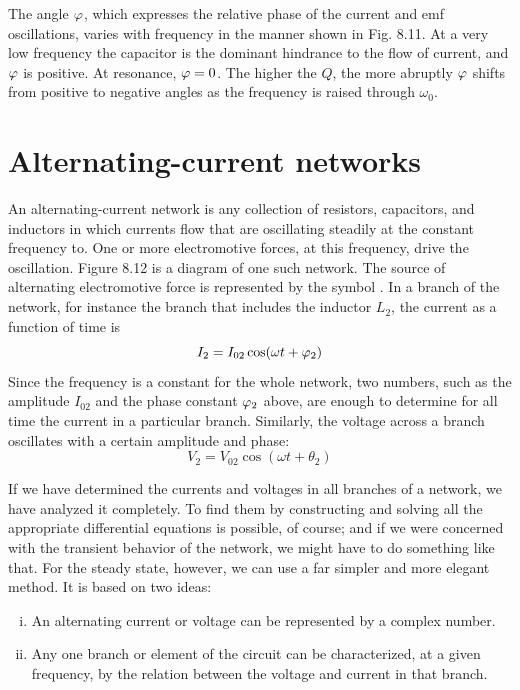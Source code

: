 The angle $\varphi$, which expresses the relative phase of the current and
emf oscillations, varies with frequency in the manner shown in
Fig. 8.11. At a very low frequency the capacitor is the dominant
hindrance to the flow of current, and $\varphi$ is positive. At resonance, $\varphi = 0$.
The higher the $Q$, the more abruptly $\varphi$ shifts from positive to negative
angles as the frequency is raised through $\omega_0$.

\section{Alternating-current networks}

An alternating-current network is any collection of resistors,
capacitors, and inductors in which currents flow that are oscillating
steadily at the constant frequency to. One or more electromotive
forces, at this frequency, drive the oscillation. Figure 8.12 is a diagram
of one such network. The source of alternating electromotive
force is represented by the symbol 
.
In a branch of the network,
for instance the branch that includes the inductor $L_2$, the current as
a function of time is
\begin{equation}
  I_2 = I_{02} \cos (\omega t + \varphi_2) 
\end{equation}
Since the frequency is a constant for the whole network, two 
numbers, such as the amplitude $I_{02}$ and the phase constant $\varphi_2$ above, are
enough to determine for all time the current in a particular branch.
Similarly, the voltage across a branch oscillates with a certain
amplitude and phase:
\begin{equation}
  V_2 = V_{02} \cos (\omega t + \theta_2) 
\end{equation}

If we have determined the currents and voltages in all branches of
a network, we have analyzed it completely. To find them by constructing
and solving all the appropriate differential equations is
possible, of course; and if we were concerned with the transient behavior
of the network, we might have to do something like that. For
the steady state, however, we can use a far simpler and more elegant
method. It is based on two ideas:
\begin{enumerate}[(i)]
\item An alternating current or voltage can be represented by a
      complex number.
\item Any one branch or element of the circuit can be 
      characterized, at a given frequency, by the relation between the
      voltage and current in that branch.
\end{enumerate}

